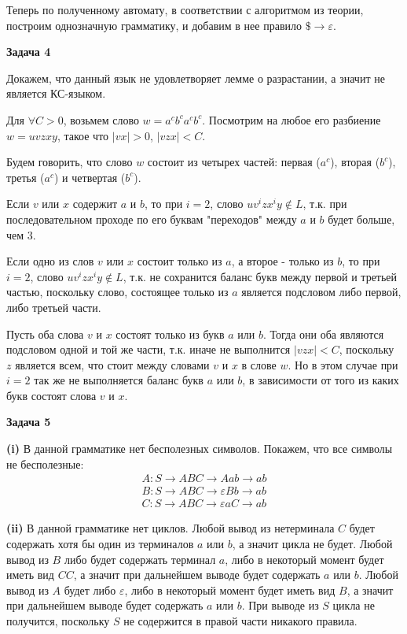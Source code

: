 \documentclass[10pt]{article}
\let \eps \varepsilon
\begin{document}
Теперь по полученному автомату, в соответствии с алгоритмом из теории, построим однозначную грамматику, и добавим в нее правило $\$ \rightarrow \eps$.

\medskip

{\bf Задача 4}

Докажем, что данный язык не удовлетворяет лемме о разрастании, а значит не является КС-языком.

Для $\forall C > 0$, возьмем слово $w = a^c b^c a^c b^c$. Посмотрим на любое его разбиение $w = uvzxy$, такое что $|vx| > 0$, $|vzx| < C$.

Будем говорить, что слово $w$ состоит из четырех частей: первая ($a^c$), вторая ($b^c$), третья ($a^c$) и четвертая ($b^c$).

Если $v$ или $x$ содержит $a$ и $b$, то при $i = 2$, слово $u v^i z x^i y \notin L$, т.к. при последовательном проходе по его буквам "переходов" между $a$ и $b$ будет больше, чем 3.

Если одно из слов $v$ или $x$ состоит только из $a$, а второе - только из $b$, то при $i = 2$, слово $u v^i z x^i y \notin L$, т.к. не сохранится баланс букв между первой и третьей частью, поскольку слово, состоящее только из $a$ является подсловом либо первой, либо третьей части.

Пусть оба слова $v$ и $x$ состоят только из букв $a$ или $b$. Тогда они оба являются подсловом одной и той же части, т.к. иначе не выполнится $|vzx| < C$, поскольку $z$ является всем, что стоит между словами $v$ и $x$ в слове $w$. Но в этом случае при $i = 2$ так же не выполняется баланс букв $a$ или $b$, в зависимости от того из каких букв состоят слова $v$ и $x$.

\medskip

{\bf Задача 5}

{\bf (i)}
В данной грамматике нет бесполезных символов. Покажем, что все символы не бесполезные:
\begin{align*}
  A: S \rightarrow ABC \rightarrow Aab \rightarrow ab \\
  B: S \rightarrow ABC \rightarrow \eps Bb \rightarrow ab \\
  C: S \rightarrow ABC \rightarrow \eps a C \rightarrow ab
\end{align*}

{\bf (ii)}
В данной грамматике нет циклов. Любой вывод из нетерминала $C$ будет содержать хотя бы один из терминалов $a$ или $b$, а значит цикла не будет. Любой вывод из $B$ либо будет содержать терминал $a$, либо в некоторый момент будет иметь вид $CC$, а значит при дальнейшем выводе будет содержать $a$ или $b$. Любой вывод из $A$ будет либо $\eps$, либо в некоторый момент будет иметь вид $B$, а значит при дальнейшем выводе будет содержать $a$ или $b$. При выводе из $S$ цикла не получится, поскольку $S$ не содержится в правой части никакого правила.
\end{document}

